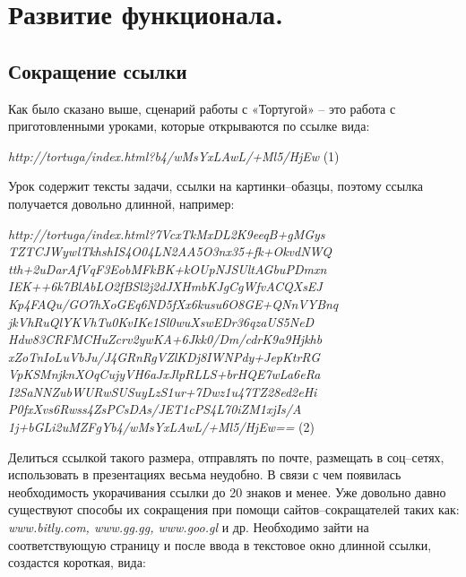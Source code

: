\chapter{Развитие функционала.} \label{chapt2}

\section{Сокращение ссылки} \label{sect1_1}

Как было сказано выше, сценарий работы с «Тортугой» – это работа с приготовленными уроками, которые открываются по ссылке вида: \par
\vspace{6mm}
\begin{center}
 \textit{ http://tortuga/index.html?b4/wMsYxLAwL/+Ml5/HjEw } (1)\par

\end{center}
\vspace{6mm}

Урок содержит тексты задачи, ссылки на картинки–обазцы, поэтому ссылка получается довольно длинной, например: \par

\begin{center}
\vspace{6mm}
 \textit{ http://tortuga/index.html?7VcxTkMxDL2K9eeqB+gMGys
 TZTCJWywlTkhshIS4O04LN2AA5O3nx35+fk+OkvdNWQ
 tth+2uDarAfVqF3EobMFkBK+kOUpNJSUltAGbuPDmxn
 IEK++6k7BlAbLO2fBSl2j2dJXHmbKJgCgWfvACQXsEJ
 Kp4FAQu/GO7hXoGEq6ND5fXx6kusu6O8GE+QNnVYBnq
 jkVhRuQlYKVhTu0KvIKe1Sl0wuXswEDr36qzaUS5NeD
 Hdw83CRFMCHuZcrv2ywKA+6Jkk0/Dm/cdrK9a9Hjkhb
 xZoTnIoLuVbJu/J4GRnRgVZlKDj8IWNPdy+JepKtrRG
 VpKSMnjknXOqCujyVH6aJxJlpRLLS+brHQE7wLa6eRa
 I2SaNNZubWURwSUSuyLzS1ur+7Dwz1u47TZ28ed2eHi
 P0fxXvs6Rwss4ZsPCsDAs/JET1cPS4L70iZM1xjIs/A
 1j+bGLi2uMZFgYb4/wMsYxLAwL/+Ml5/HjEw== } (2)\par
\end{center}

\vspace{6mm}

Делиться ссылкой такого размера, отправлять по почте, размещать в соц–сетях, использовать в презентациях весьма неудобно. В связи с чем появилась необходимость укорачивания ссылки до 20 знаков и менее. Уже довольно давно существуют способы их сокращения при помощи сайтов–сокращателей таких как:  \textit{www.bitly.com, www.gg.gg, www.goo.gl} и др. Необходимо зайти на соответствующую страницу и после ввода в текстовое окно длинной ссылки, создастся короткая, вида:
 
